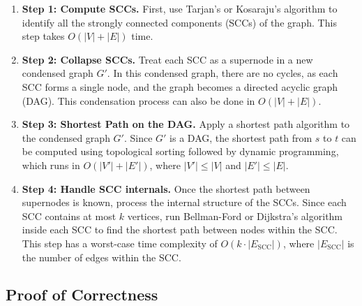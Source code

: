 \documentclass[11pt]{article}
\begin{document}
\begin{enumerate}
    \item \textbf{Step 1: Compute SCCs.} First, use Tarjan's or Kosaraju's algorithm to identify all the strongly connected components (SCCs) of the graph. This step takes \( O(|V| + |E|) \) time.
    
    \item \textbf{Step 2: Collapse SCCs.} Treat each SCC as a supernode in a new condensed graph \( G' \). In this condensed graph, there are no cycles, as each SCC forms a single node, and the graph becomes a directed acyclic graph (DAG). This condensation process can also be done in \( O(|V| + |E|) \).
    
    \item \textbf{Step 3: Shortest Path on the DAG.} Apply a shortest path algorithm to the condensed graph \( G' \). Since \( G' \) is a DAG, the shortest path from \( s \) to \( t \) can be computed using topological sorting followed by dynamic programming, which runs in \( O(|V'| + |E'|) \), where \( |V'| \leq |V| \) and \( |E'| \leq |E| \).
    
    \item \textbf{Step 4: Handle SCC internals.} Once the shortest path between supernodes is known, process the internal structure of the SCCs. Since each SCC contains at most \( k \) vertices, run Bellman-Ford or Dijkstra’s algorithm inside each SCC to find the shortest path between nodes within the SCC. This step has a worst-case time complexity of \( O(k \cdot |E_{\text{SCC}}|) \), where \( |E_{\text{SCC}}| \) is the number of edges within the SCC.
\end{enumerate}

\subsection*{Proof of Correctness}
\end{document}

